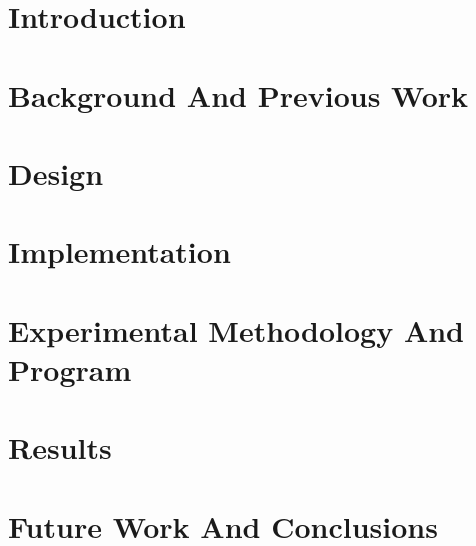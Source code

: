 \documentclass{report}
\begin{document}
\begin{singlespacing}



\tableofcontents

\newpage

\chapter{Introduction}
\label{chapter:introduction}


\chapter{Background And Previous Work}
\label{chapter:background_and_previous_work}


\chapter{Design}
\label{chapter:design}


\chapter{Implementation}
\label{chapter:implementation}


\chapter{Experimental Methodology And Program}
\label{chapter:experimental_methodology_and_program}


\chapter{Results}
\label{chapter:results}


\chapter{Future Work And Conclusions}
\label{chapter:future_work_and_conclusions}


\newpage


 

\end{singlespacing}
\end{document}

